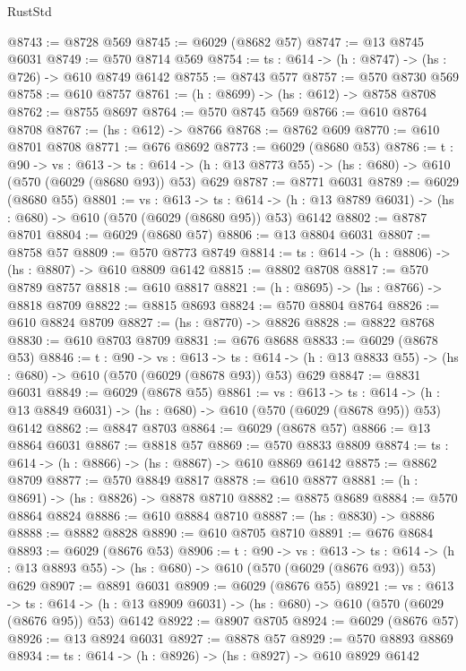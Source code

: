 \begin{lexlean}{RustStd}
\begin{coremodule}
@8743 := @8728 @569
@8745 := @6029 (@8682 @57)
@8747 := @13 @8745 @6031
@8749 := @570 @8714 @569
@8754 := {ts : @614} -> (h : @8747) -> (hs : @726) -> @610 @8749 @6142
@8755 := @8743 @577
@8757 := @570 @8730 @569
@8758 := @610 @8757
@8761 := (h : @8699) -> (hs : @612) -> @8758 @8708
@8762 := @8755 @8697
@8764 := @570 @8745 @569
@8766 := @610 @8764 @8708
@8767 := (hs : @612) -> @8766
@8768 := @8762 @609
@8770 := @610 @8701 @8708
@8771 := @676 @8692
@8773 := @6029 (@8680 @53)
@8786 := {t : @90} ->
  {vs : @613} ->
  {ts : @614} -> (h : @13 @8773 @55) -> (hs : @680) -> @610 (@570 (@6029 (@8680 @93)) @53) @629
@8787 := @8771 @6031
@8789 := @6029 (@8680 @55)
@8801 := {vs : @613} ->
  {ts : @614} -> (h : @13 @8789 @6031) -> (hs : @680) -> @610 (@570 (@6029 (@8680 @95)) @53) @6142
@8802 := @8787 @8701
@8804 := @6029 (@8680 @57)
@8806 := @13 @8804 @6031
@8807 := @8758 @57
@8809 := @570 @8773 @8749
@8814 := {ts : @614} -> (h : @8806) -> (hs : @8807) -> @610 @8809 @6142
@8815 := @8802 @8708
@8817 := @570 @8789 @8757
@8818 := @610 @8817
@8821 := (h : @8695) -> (hs : @8766) -> @8818 @8709
@8822 := @8815 @8693
@8824 := @570 @8804 @8764
@8826 := @610 @8824 @8709
@8827 := (hs : @8770) -> @8826
@8828 := @8822 @8768
@8830 := @610 @8703 @8709
@8831 := @676 @8688
@8833 := @6029 (@8678 @53)
@8846 := {t : @90} ->
  {vs : @613} ->
  {ts : @614} -> (h : @13 @8833 @55) -> (hs : @680) -> @610 (@570 (@6029 (@8678 @93)) @53) @629
@8847 := @8831 @6031
@8849 := @6029 (@8678 @55)
@8861 := {vs : @613} ->
  {ts : @614} -> (h : @13 @8849 @6031) -> (hs : @680) -> @610 (@570 (@6029 (@8678 @95)) @53) @6142
@8862 := @8847 @8703
@8864 := @6029 (@8678 @57)
@8866 := @13 @8864 @6031
@8867 := @8818 @57
@8869 := @570 @8833 @8809
@8874 := {ts : @614} -> (h : @8866) -> (hs : @8867) -> @610 @8869 @6142
@8875 := @8862 @8709
@8877 := @570 @8849 @8817
@8878 := @610 @8877
@8881 := (h : @8691) -> (hs : @8826) -> @8878 @8710
@8882 := @8875 @8689
@8884 := @570 @8864 @8824
@8886 := @610 @8884 @8710
@8887 := (hs : @8830) -> @8886
@8888 := @8882 @8828
@8890 := @610 @8705 @8710
@8891 := @676 @8684
@8893 := @6029 (@8676 @53)
@8906 := {t : @90} ->
  {vs : @613} ->
  {ts : @614} -> (h : @13 @8893 @55) -> (hs : @680) -> @610 (@570 (@6029 (@8676 @93)) @53) @629
@8907 := @8891 @6031
@8909 := @6029 (@8676 @55)
@8921 := {vs : @613} ->
  {ts : @614} -> (h : @13 @8909 @6031) -> (hs : @680) -> @610 (@570 (@6029 (@8676 @95)) @53) @6142
@8922 := @8907 @8705
@8924 := @6029 (@8676 @57)
@8926 := @13 @8924 @6031
@8927 := @8878 @57
@8929 := @570 @8893 @8869
@8934 := {ts : @614} -> (h : @8926) -> (hs : @8927) -> @610 @8929 @6142

\end{coremodule}
\end{lexlean}
